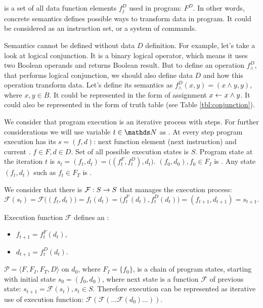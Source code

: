  is a set of all data function
elements $f^D_j$ used in program: $F^D$.
In other words, concrete semantics defines
possible ways to transform data in program.
It could be considered as an instruction set, or a system of commands.

Semantics cannot be defined without data $D$ definition.
For example, let's take a look at logical conjunction.
It is a binary logical operator, which means it uses two Boolean operands
and returns Boolean result.
But to define an operation $f^D_\land$, that performs logical conjunction,
we should also define data $D$ and how this operation transform data.
Let's define its semantics as $f^D_\land(x, y) = (x \land y, y)$,
where $x, y \in B$.
It could be represented in the form of assignment $x \leftarrow x \land y$.
It could also be represented in the form of truth table
(see Table \ref{tbl:conjunction}).


We consider that program execution is an iterative process with steps.
For further considerations we will use variable $t \in \nat$ as
.
At every step program execution has its  $s = (f, d)$:
next function element (next instruction) and current .
$f \in F, d \in D$.
Set of all possible execution states is $S$.
Program state at the iteration $t$ is
$s_t = (f_t, d_t) = \big((f_t^F, f_t^D), d_t\big)$.
$(f_0, d_0), f_0 \in F_I$ is .
Any state $(f_t, d_t)$ such as $f_t \in F_T$ is .

We consider that there is  $\mathcal{F}: S \rightarrow S$
that manages the execution process:
\[\mathcal{F}(s_t) = \mathcal{F}\big((f_t, d_t)\big) =
    f_t(d_t) =
    \big(f_t^F(d_t), f_t^D(d_t)\big) =
    (f_{t + 1}, d_{t + 1}) = s_{t + 1}.\]

Execution function $\mathcal{F}$ defines an :
\begin{itemize}
    \item $f_{t + 1} = f_t^F(d_t)$,
    \item $d_{t + 1} = f_t^D(d_t)$.
\end{itemize}

$\mathcal{P} = \langle F, F_I, F_T, D \rangle$
on  $d_0$, where $F_I = \{f_0\}$,
is a chain of program states,
starting with initial state $s_0 = (f_0, d_0)$,
where next state is a function $\mathcal{F}$ of previous state:
$s_{t + 1} = \mathcal{F}(s_t), s_t \in S$.
Therefore execution can be represented as iterative use of execution function:
$\mathcal{F}(\mathcal{F}(\dots\mathcal{F}(d_0)\dots))$.

